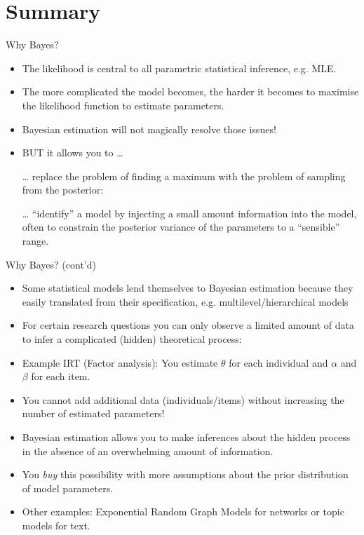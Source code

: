 \documentclass[10pt,handout]{beamer}
\begin{document}
\section{Summary}%
\label{sec:my_personal_take}

\begin{frame}[t]{Why Bayes?}

  \begin{itemize}[<+->]
    \item The likelihood is central to all parametric statistical inference, e.g. MLE.
    \item The more complicated the model becomes, the harder it becomes to maximise the likelihood function to estimate parameters.
    \item Bayesian estimation will not magically resolve those issues!
    \item BUT it allows you to \dots
  \item[\dots{}] replace the problem of finding a maximum with the problem of sampling from the posterior: \\
  \item[\dots{}] \enquote{identify} a model by injecting a small amount information into the model, often to constrain the posterior variance of the parameters to a \enquote{sensible} range.
  \end{itemize}

\end{frame}

\begin{frame}[t]{Why Bayes? (cont'd)}

  \begin{itemize}
    \item Some statistical models lend themselves to Bayesian estimation because they easily translated from their specification, e.g. multilevel/hierarchical models
    \item For certain research questions you can only observe a limited amount of data to infer a complicated (hidden) theoretical process:
    \item Example IRT (Factor analysis): You estimate $\theta$ for each individual and $\alpha$ and $\beta$ for each item.
    \item You cannot add additional data (individuals/items) without increasing the number of estimated parameters!
    \item Bayesian estimation allows you to make inferences about the hidden process in the absence of an overwhelming amount of information.
    \item You \textit{buy} this possibility with more assumptions about the prior distribution of model parameters.

    \item Other examples: Exponential Random Graph Models for networks or topic models for text.
  \end{itemize}

\end{frame}
\end{document}
